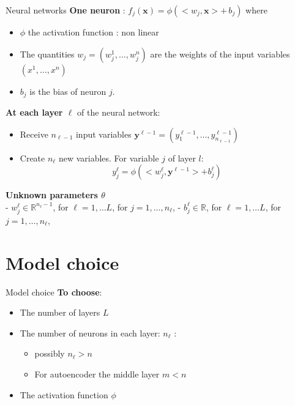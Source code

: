 \documentclass[
  12pt,
  ignorenonframetext,
  compress]{beamer}
\providecommand{\tightlist}{%
  \setlength{\itemsep}{0pt}\setlength{\parskip}{0pt}}
\begin{document}
\begin{frame}{Neural networks}
\textbf{One neuron} :
\(f_j (\mathbf{x}) = \phi (<w_j, \mathbf {x}> + \, b_j)\) where

\begin{itemize}
\item
  \(\phi\) the activation function : non linear
\item
  The quantities \(w_j = (w_j^1, \dots, w_j^n)\) are the weights of the
  input variables \((x^1, \dots, x^n)\)
\item
  \(b_j\) is the bias of neuron \(j\).
\end{itemize}

\textbf{At each layer \(\ell\)} of the neural network:

\begin{itemize}
\item
  Receive \(n_{\ell-1}\) input variables
  \(\mathbf{y}^{\ell-1} =(y^{\ell-1}_{1}, \dots,y^{\ell-1}_{n_{\ell-1}})\)
\item
  Create \(n_\ell\) new variables. For variable \(j\) of layer \(l\):
  \[y^{\ell}_{j} = \phi(<w^\ell_j, \mathbf{y}^{\ell-1}>  +  b^{\ell}_j)\]
\end{itemize}

\textbf{Unknown parameters \(\theta\)}\\
- \(w^\ell_j \in \mathbb{R}^{n_\ell-1}\), for \(\ell =1, \dots L\), for
\(j=1,\dots,n_{\ell}\), - \(b^\ell_j \in \mathbb{R}\), for
\(\ell =1, \dots L\), for \(j=1,\dots,n_{\ell}\),
\end{frame}

\begin{frame}
\end{frame}

\hypertarget{model-choice}{%
\section{Model choice}\label{model-choice}}

\begin{frame}{Model choice}
\textbf{To choose}:

\begin{itemize}
\item
  The number of layers \(L\)
\item
  The number of neurons in each layer: \(n_\ell\) :

  \begin{itemize}
  \tightlist
  \item
    possibly \(n_\ell > n\)
  \item
    For autoencoder the middle layer \(m < n\)
  \end{itemize}
\item
  The activation function \(\phi\)
\end{itemize}
\end{frame}
\end{document}
